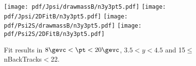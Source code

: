 \begin{figure}[H]
\begin{center}
\texttt{[image: pdf/Jpsi/drawmassB/n3y3pt5.pdf]}
\texttt{[image: pdf/Jpsi/2DFitB/n3y3pt5.pdf]}
\vspace*{-0.5cm}
\texttt{[image: pdf/Psi2S/drawmassB/n3y3pt5.pdf]}
\texttt{[image: pdf/Psi2S/2DFitB/n3y3pt5.pdf]}
\vspace*{-0.5cm}
\end{center}
\caption{Fit results in $8\gevc<\pt<20\gevc$, $3.5<y<4.5$ and 15$\leq$nBackTracks$<$22.}
\label{Fitn3y3pt5}
\end{figure}
